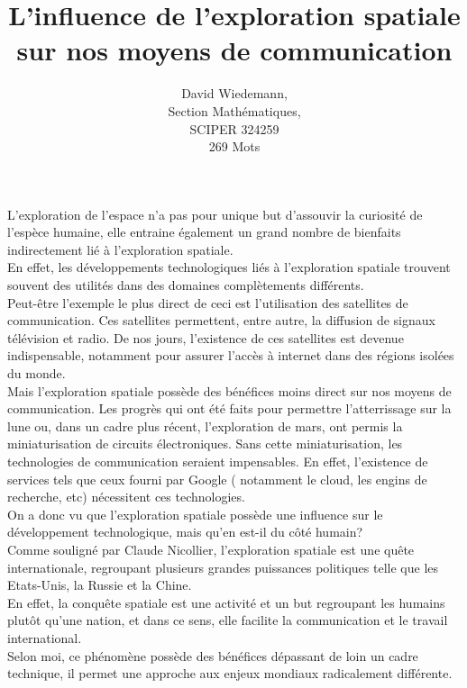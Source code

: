 \documentclass[11pt, a4paper]{article}
\title{L'influence de l'exploration spatiale sur nos moyens de communication}
\author{David Wiedemann,\\
	Section Mathématiques,\\ SCIPER 324259\\
269 Mots
}
\date{}
\begin{document}
\maketitle
L'exploration de l'espace n'a pas pour unique but d'assouvir la curiosité de l'espèce humaine, elle entraine également un grand nombre de bienfaits indirectement lié à l'exploration spatiale.\\
En effet, les développements technologiques liés à l'exploration spatiale trouvent souvent des utilités dans des domaines complètements différents.\\
Peut-être l'exemple le plus direct de ceci est l'utilisation des satellites de communication.
Ces satellites permettent, entre autre, la diffusion de signaux télévision et radio.
De nos jours, l'existence de ces satellites est devenue indispensable, notamment pour assurer l'accès à internet dans des régions isolées du monde.\\

Mais l'exploration spatiale possède des bénéfices moins direct sur nos moyens de communication.
Les progrès qui ont été faits pour permettre l'atterrissage sur la lune ou, dans un cadre plus récent, l'exploration de mars, ont permis la miniaturisation de circuits électroniques.
Sans cette miniaturisation, les technologies de communication seraient impensables. 
En effet, l'existence de services tels que ceux fourni par Google ( notamment le cloud, les engins de recherche, etc) nécessitent ces technologies.\\

On a donc vu que l'exploration spatiale possède une influence sur le développement technologique, mais qu'en est-il du côté humain?\\
Comme souligné par Claude Nicollier, l'exploration spatiale est une quête internationale, regroupant plusieurs grandes puissances politiques telle que les Etats-Unis, la Russie et la Chine.\\
En effet, la conquête spatiale est une activité et un but regroupant les humains plutôt qu'une nation, et dans ce sens, elle facilite la communication et le travail international.\\ 
Selon moi, ce phénomène possède des bénéfices dépassant de loin un cadre technique, il permet une approche aux enjeux mondiaux radicalement différente.\\
\end{document}
